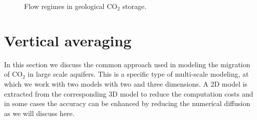 \begin{figure}[tbp!]%
  \hspace{0.2cm}
  \hspace{0.1cm}
  \caption{Flow regimes in geological $\mbox{CO}_2$ storage.}
 \label{fig:Frc}
\end{figure}


\section{Vertical averaging}

In this section we discuss the common approach used in modeling the migration
of $\mbox{CO}_2$ in large scale aquifers. This is a specific type of multi-scale
modeling, at which we work with two models with two and three
dimensions. A $2\mbox{D}$ model is extracted from the corresponding $3\mbox{D}$ 
model to reduce the computation costs and in some cases the accuracy can be
enhanced by reducing the numerical diffusion as we will discuss here.

